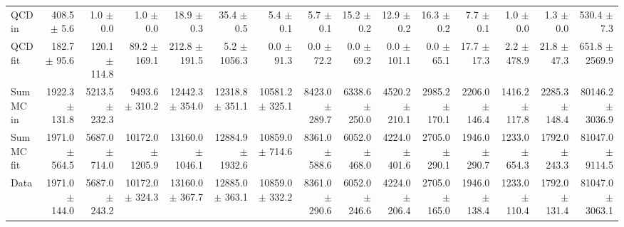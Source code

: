 \begin{table}[htbp]
{\begin{tabular}{lrrrrrrrrrrrrrr}
\hline
QCD in & 408.5 $\pm$ 5.6 & 1.0 $\pm$ 0.0 & 1.0 $\pm$ 0.0 & 18.9 $\pm$ 0.3 & 35.4 $\pm$ 0.5 & 5.4 $\pm$ 0.1 & 5.7 $\pm$ 0.1 & 15.2 $\pm$ 0.2 & 12.9 $\pm$ 0.2 & 16.3 $\pm$ 0.2 & 7.7 $\pm$ 0.1 & 1.0 $\pm$ 0.0 & 1.3 $\pm$ 0.0 & 530.4 $\pm$ 7.3 \\
QCD fit & 182.7 $\pm$ 95.6 & 120.1 $\pm$ 114.8 & 89.2 $\pm$ 169.1 & 212.8 $\pm$ 191.5 & 5.2 $\pm$ 1056.3 & 0.0 $\pm$ 91.3 & 0.0 $\pm$ 72.2 & 0.0 $\pm$ 69.2 & 0.0 $\pm$ 101.1 & 0.0 $\pm$ 65.1 & 17.7 $\pm$ 17.3 & 2.2 $\pm$ 478.9 & 21.8 $\pm$ 47.3 & 651.8 $\pm$ 2569.9 \\
\hline
Sum MC in & 1922.3 $\pm$ 131.8 & 5213.5 $\pm$ 232.3 & 9493.6 $\pm$ 310.2 & 12442.3 $\pm$ 354.0 & 12318.8 $\pm$ 351.1 & 10581.2 $\pm$ 325.1 & 8423.0 $\pm$ 289.7 & 6338.6 $\pm$ 250.0 & 4520.2 $\pm$ 210.1 & 2985.2 $\pm$ 170.1 & 2206.0 $\pm$ 146.4 & 1416.2 $\pm$ 117.8 & 2285.3 $\pm$ 148.4& 80146.2 $\pm$ 3036.9 \\
Sum MC fit & 1971.0 $\pm$ 564.5 & 5687.0 $\pm$ 714.0 & 10172.0 $\pm$ 1205.9 & 13160.0 $\pm$ 1046.1 & 12884.9 $\pm$ 1932.6 & 10859.0 $\pm$ 714.6 & 8361.0 $\pm$ 588.6 & 6052.0 $\pm$ 468.0 & 4224.0 $\pm$ 401.6 & 2705.0 $\pm$ 290.1 & 1946.0 $\pm$ 290.7 & 1233.0 $\pm$ 654.3 & 1792.0 $\pm$ 243.3 & 81047.0 $\pm$ 9114.5 \\
\hline
Data & 1971.0 $\pm$ 144.0 & 5687.0 $\pm$ 243.2 & 10172.0 $\pm$ 324.3 & 13160.0 $\pm$ 367.7 & 12885.0 $\pm$ 363.1 & 10859.0 $\pm$ 332.2 & 8361.0 $\pm$ 290.6 & 6052.0 $\pm$ 246.6 & 4224.0 $\pm$ 206.4 & 2705.0 $\pm$ 165.0 & 1946.0 $\pm$ 138.4 & 1233.0 $\pm$ 110.4 & 1792.0 $\pm$ 131.4 & 81047.0 $\pm$ 3063.1 \\
\hline
\end{tabular}
}
\end{table}
